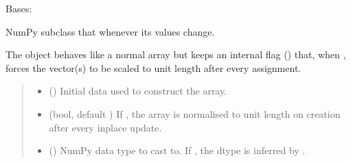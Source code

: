 \documentclass[letterpaper,10pt,english]{sphinxmanual}
\begin{document}
\begin{fulllineitems}
\label{\detokenize{generated/photon_canon.optics:photon_canon.optics.IndexableProperty}}
\pysigstartsignatures
\pysiglinewithargsret
{}
{\sphinxparamcomma {}\sphinxparamcomma {}}
{}
\pysigstopsignatures
\sphinxAtStartPar
Bases: 

\sphinxAtStartPar
NumPy  subclass that  whenever its
values change.

\sphinxAtStartPar
The object behaves like a normal array but keeps an internal flag
({\hyperref[\detokenize{generated/photon_canon.optics:photon_canon.optics.IndexableProperty.normalize}]{}}) that, when , forces the vector(s) to be
scaled to unit length after every assignment.
\begin{quote}\begin{description}
\begin{itemize}
\item {} 
\sphinxAtStartPar
{} () \textendash{} Initial data used to construct the array.

\item {} 
\sphinxAtStartPar
{} (bool, default ) \textendash{} If , the array is normalised to unit length
on creation  after every in\sphinxhyphen{}place update.

\item {} 
\sphinxAtStartPar
{} (\sphinxstyleliteralemphasis{\sphinxupquote{ | }}) \textendash{} NumPy data type to cast  to.  If , the dtype
is inferred by .


\end{itemize}
\end{description}
\end{quote}
\end{fulllineitems}
\end{document}
